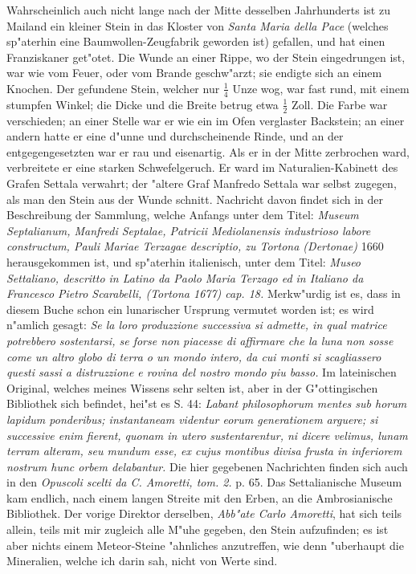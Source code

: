 \documentclass[a4paper, 11pt, oneside, polutonikogreek, german]{article}
\begin{document}
Wahrscheinlich auch nicht lange nach der Mitte desselben Jahrhunderts ist zu Mailand ein kleiner Stein in das Kloster von \emph{Santa Maria della Pace} (welches sp"aterhin eine Baumwollen-Zeugfabrik geworden ist) gefallen, und hat einen Franziskaner get"otet. Die Wunde an einer Rippe, wo der Stein eingedrungen ist, war wie vom Feuer, oder vom Brande geschw"arzt; sie endigte sich an einem Knochen. Der gefundene Stein, welcher nur $\mathfrak{\frac{1}{4}}$ Unze wog, war fast rund, mit einem stumpfen Winkel; die Dicke und die Breite betrug etwa $\mathfrak{\frac{1}{2}}$ Zoll. Die Farbe war verschieden; an einer Stelle war er wie ein im Ofen verglaster Backstein; an einer andern hatte er eine d"unne und durchscheinende Rinde, und an der entgegengesetzten war er rau und eisenartig. Als er in der Mitte zerbrochen ward, verbreitete er eine starken Schwefelgeruch. Er ward im Naturalien-Kabinett des Grafen Settala verwahrt; der "altere Graf Manfredo Settala war selbst zugegen, als man den Stein aus der Wunde schnitt. Nachricht davon findet sich in der Beschreibung der Sammlung, welche Anfangs unter dem Titel: \emph{Museum Septalianum, Manfredi Septalae, Patricii Mediolanensis industrioso labore constructum, Pauli Mariae Terzagae descriptio, zu Tortona (Dertonae)} 1660 herausgekommen ist, und sp"aterhin italienisch, unter dem Titel: \emph{Museo Settaliano, descritto in Latino da Paolo Maria Terzago ed in Italiano da Francesco Pietro Scarabelli, (Tortona 1677) cap. 18.} Merkw"urdig ist es, dass in diesem Buche schon ein lunarischer Ursprung vermutet worden ist; es wird n"amlich gesagt: \emph{Se la loro produzzione successiva si admette, in qual matrice potrebbero sostentarsi, se forse non piacesse di affirmare che la luna non sosse come un altro globo di terra o un mondo intero, da cui monti si scagliassero questi sassi a distruzzione e rovina del nostro mondo piu basso.} Im lateinischen Original, welches meines Wissens sehr selten ist, aber in der G"ottingischen Bibliothek sich befindet, hei"st es S. 44: \emph{Labant philosophorum mentes sub horum lapidum ponderibus; instantaneam videntur eorum generationem arguere; si successive enim fierent, quonam in utero sustentarentur, ni dicere velimus, lunam terram alteram, seu mundum esse, ex cujus montibus divisa frusta in inferiorem nostrum hunc orbem delabantur.} Die hier gegebenen Nachrichten finden sich auch in den \emph{Opuscoli scelti da C. Amoretti, tom. 2.} p. 65. Das Settalianische Museum kam endlich, nach einem langen Streite mit den Erben, an die Ambrosianische Bibliothek. Der vorige Direktor derselben, \emph{Abb"ate Carlo Amoretti}, hat sich teils allein, teils mit mir zugleich alle M"uhe gegeben, den Stein aufzufinden; es ist aber nichts einem Meteor-Steine "ahnliches anzutreffen, wie denn "uberhaupt die Mineralien, welche ich darin sah, nicht von Werte sind.
\end{document}
